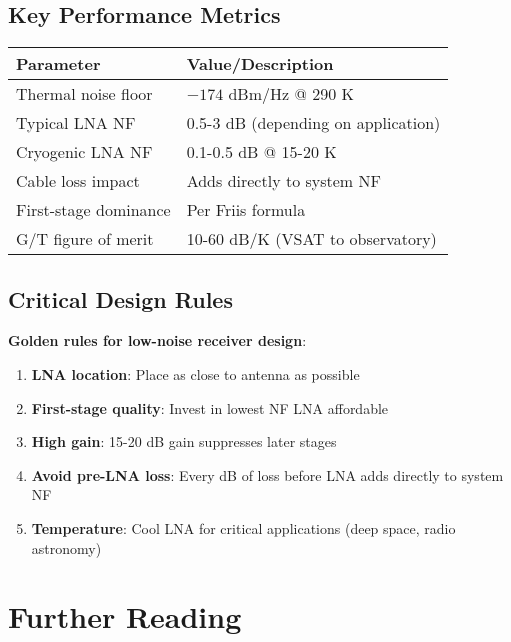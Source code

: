\subsection{Key Performance Metrics}

\begin{center}
\begin{tabular}{@{}ll@{}}
\toprule
\textbf{Parameter} & \textbf{Value/Description} \\
\midrule
Thermal noise floor & $-174$ dBm/Hz @ 290 K \\
Typical LNA NF & 0.5-3 dB (depending on application) \\
Cryogenic LNA NF & 0.1-0.5 dB @ 15-20 K \\
Cable loss impact & Adds directly to system NF \\
First-stage dominance & Per Friis formula \\
G/T figure of merit & 10-60 dB/K (VSAT to observatory) \\
\bottomrule
\end{tabular}
\end{center}

\subsection{Critical Design Rules}

\textbf{Golden rules for low-noise receiver design}:
\begin{enumerate}
\item \textbf{LNA location}: Place as close to antenna as possible
\item \textbf{First-stage quality}: Invest in lowest NF LNA affordable
\item \textbf{High gain}: 15-20 dB gain suppresses later stages
\item \textbf{Avoid pre-LNA loss}: Every dB of loss before LNA adds directly to system NF
\item \textbf{Temperature}: Cool LNA for critical applications (deep space, radio astronomy)
\end{enumerate}

\section{Further Reading}

